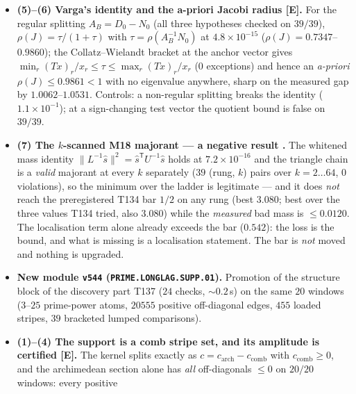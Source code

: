 \documentclass[11pt]{article}
\providecommand{\mE}{\textbf{[E]}}\providecommand{\mC}{\textbf{[C]}}
\begin{document}
\begin{itemize}[leftmargin=1.5em]
$0.9070$) --- one solve, one sign check, no eigenvalue (control: a positive off-diagonal makes it
false, $1.9000>0.1000$). Lumping commutes with diagonal shifts, $(A-sI)_B=A_B-sI$
($2.5\times10^{-16}$ on $312$ rungs), and $(A_B-sI)^{-1}\ge A_B^{-1}\ge0$ entrywise
(Berman--Plemmons 1979, violation $0$), so $\max_r x_r(s)$ and the a-priori margin
$\|L_\Delta\|_\infty\max_r x_r(s)$ are non-decreasing along the whole ladder: the shifted ladder is
\emph{structurally empty} --- a theorem, not a measurement.
\item \textbf{(5)--(6) Varga's identity and the a-priori Jacobi radius \mE.} For the regular
splitting $A_B=D_0-N_0$ (all three hypotheses checked on $39/39$),
$\rho(J)=\tau/(1+\tau)$ with $\tau=\rho(A_B^{-1}N_0)$ at $4.8\times10^{-15}$
($\rho(J)=0.7347$--$0.9860$); the Collatz--Wielandt bracket at the anchor vector gives
$\min_r(Tx)_r/x_r\le\tau\le\max_r(Tx)_r/x_r$ ($0$ exceptions) and hence an \emph{a-priori}
$\rho(J)\le0.9861<1$ with no eigenvalue anywhere, sharp on the measured gap by
$1.0062$--$1.0531$. Controls: a non-regular splitting breaks the identity
($1.1\times10^{-1}$); at a sign-changing test vector the quotient bound is false on $39/39$.
\item \textbf{(7) The $k$-scanned M18 majorant --- a negative result \mX.} The whitened mass
identity $\|L^{-1}\hat s\|^2=\hat s^{\mathsf T}U^{-1}\hat s$ holds at $7.2\times10^{-16}$ and the
triangle chain is a \emph{valid} majorant at every $k$ separately ($39$ (rung, $k$) pairs over
$k=2\ldots64$, $0$ violations), so the minimum over the ladder is legitimate --- and it does
\emph{not} reach the preregistered T134 bar $1/2$ on any rung (best $3.080$; best over the three
values T134 tried, also $3.080$) while the \emph{measured} bad mass is $\le0.0120$. The
localisation term alone already exceeds the bar ($0.542$): the loss is the bound, and what is
missing is a localisation statement. The bar is \emph{not} moved and nothing is upgraded.
\item \textbf{New module \texttt{v544} (\texttt{PRIME.LONGLAG.SUPP.01}).} Promotion of the
structure block of the discovery part T137 ($24$ checks, ${\sim}0.2$\,s) on the same $20$ windows
($3$--$25$ prime-power atoms, $20555$ positive off-diagonal edges, $455$ loaded stripes, $39$
bracketed lumped comparisons).
\item \textbf{(1)--(4) The support is a comb stripe set, and its amplitude is certified \mE.} The
kernel splits exactly as $c=c_{\mathrm{arch}}-c_{\mathrm{comb}}$ with $c_{\mathrm{comb}}\ge0$, and
the archimedean section alone has \emph{all} off-diagonals $\le0$ on $20/20$ windows: every positive

\end{itemize}
\end{document}

